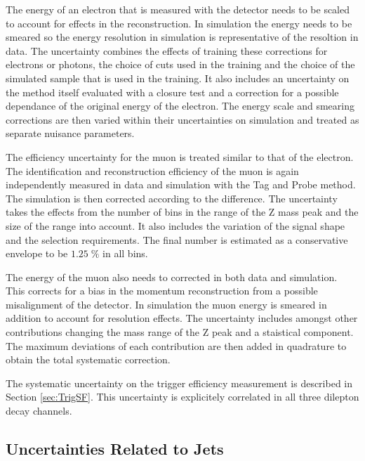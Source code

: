 The energy of an electron that is measured with the detector needs to be scaled to account for effects in the reconstruction. In simulation the energy needs to be smeared so the energy resolution in simulation is representative of the resoltion in data.
The uncertainty combines the effects of training these corrections for electrons or photons, the choice of cuts used in the training and the choice of the simulated sample that is used in the training. It also includes an uncertainty on the method itself evaluated with a closure test and a correction for a possible
dependance of the original energy of the electron.
The energy scale and smearing corrections are then varied within their uncertainties on simulation and treated as separate nuisance parameters.

The efficiency uncertainty for the muon is treated similar to that of the electron.
The identification and reconstruction efficiency of the muon is again independently measured in data and simulation with the Tag and Probe method.
The simulation is then corrected according to the difference.
The uncertainty takes the effects from the number of bins in the range of the Z mass peak and the size of the range into account. It also includes the variation of the signal shape and the 
selection requirements. The final number is estimated as a conservative envelope to be $1.25 \; \%$ in all bins.

The energy of the muon also needs to corrected in both data and simulation. This corrects for a bias in the momentum reconstruction from a possible misalignment of the detector.
In simulation the muon energy is smeared in addition to account for resolution effects.
The uncertainty includes amongst other contributions changing the mass range of the Z peak and a staistical component. The maximum deviations of each contribution are then added in quadrature 
to obtain the total systematic correction.

The systematic uncertainty on the trigger efficiency measurement is described in Section \ref{sec:TrigSF}. This uncertainty is explicitely correlated in all three dilepton decay channels.

\subsection{Uncertainties Related to Jets}

